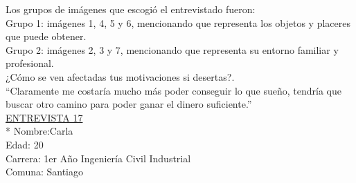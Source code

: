 Los grupos de imágenes que escogió el entrevistado fueron:\\

Grupo 1: imágenes 1, 4, 5 y 6, mencionando que representa los objetos y placeres que puede obtener. \\

Grupo 2: imágenes 2, 3 y 7, mencionando que representa su entorno familiar y profesional.\\


¿Cómo se ven afectadas tus motivaciones si desertas?.\\

``Claramente me costaría mucho más poder conseguir lo que sueño, tendría que buscar otro camino para poder ganar el dinero suficiente.''\\


\underline {ENTREVISTA 17}\\*
Nombre:Carla \\
Edad: 20\\
Carrera: 1er Año Ingeniería Civil Industrial\\
Comuna: Santiago\\

